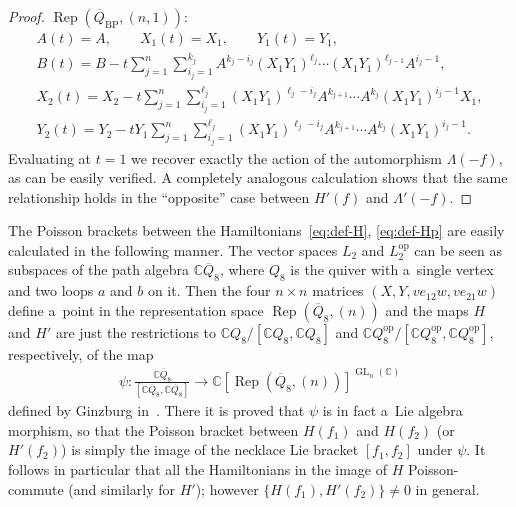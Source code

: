 \documentclass[11pt]{article}
\newcommand{\bb}[1]{\mathbb{#1}}
\newcommand{\app}[3]{#1\colon #2\to #3}
\newcommand{\ol}[1]{\overline{#1}}
\DeclareMathOperator{\GL}{GL}
\DeclareMathOperator{\Rep}{Rep}
\begin{document}
\begin{proof}
\(\Rep(\ol{Q}_{\mathrm{BP}},(n,1))\):
\begin{gather*}
A(t)=A,
\qquad
X_{1}(t)=X_{1},
\qquad
Y_{1}(t)=Y_{1},
\\
B(t)=B-t\sum_{j=1}^{n}\sum_{i_{j}=1}^{k_{j}}A^{k_{j}-i_{j}}(X_{1}Y_{1})^{\ell_{j}}\cdots(X_{1}Y_{1}
)^{\ell_{j-1}}A^{i_{j}-1},
\\
X_{2}(t)=X_{2}-t\sum_{j=1}^{n}\sum_{i_{j}=1}^{\ell_{j}}(X_{1}Y_{1})^{\ell_{j}-i_{j}}A^{k_{j+1}}
\cdots A^{k_{j}}(X_{1}Y_{1})^{i_{j}-1}X_{1},
\\
Y_{2}(t)=Y_{2}-t Y_{1}\sum_{j=1}^{n}\sum_{i_{j}=1}^{\ell_{j}}(X_{1}Y_{1})^{\ell_{j}-i_{j}}A^{k_{j+1}}
\cdots A^{k_{j}}(X_{1}Y_{1})^{i_{j}-1}.
\end{gather*}
Evaluating at \(t=1\) we recover exactly the action of the automorphism \(\Lambda(-f)\), as can be easily
verif\/ied.
A completely analogous calculation shows that the same relationship holds in the ``opposite'' case between
\(H'(f)\) and \(\Lambda'(-f)\).
\end{proof}

\begin{remark}
The Poisson brackets between the Hamiltonians~\eqref{eq:def-H}, \eqref{eq:def-Hp} are easily calculated in
the following manner.
The vector spaces \(L_{2}\) and \(L_{2}^{\mathrm{op}}\) can be seen as subspaces of the path algebra
\(\bb{C}\ol{Q}_{8}\), where \(Q_{8}\) is the quiver with a~single vertex and two loops \(a\) and \(b\) on
it.
Then the four \(n\times n\) matrices \((X, Y, ve_{12}w, ve_{21}w)\) def\/ine a~point in the representation
space \(\Rep(\ol{Q}_{8},(n))\) and the maps \(H\) and \(H'\) are just the restrictions to
\(\bb{C}Q_{8}/[\bb{C}Q_{8}, \bb{C}Q_{8}]\) and \(\bb{C}Q_{8}^{\mathrm{op}}/[\bb{C}Q_{8}^{\mathrm{op}},
\bb{C}Q_{8}^{\mathrm{op}}]\), respectively, of the map
\begin{gather*}
\app{\psi}{\frac{\bb{C}\ol{Q}_{8}}{[\bb{C}\ol{Q}_{8},\bb{C}\ol{Q}_{8}]}}{\bb{C}[\Rep(\ol{Q}_{8}
,(n))]^{\GL_{n}(\bb{C})}}
\end{gather*}
def\/ined by Ginzburg in~\cite{ginz01}.
There it is proved that \(\psi\) is in fact a~Lie algebra morphism, so that the Poisson bracket between
\(H(f_{1})\) and \(H(f_{2})\) (or \(H'(f_{2})\)) is simply the image of the necklace Lie bracket
\([f_{1},f_{2}]\) under \(\psi\).
It follows in particular that all the Hamiltonians in the image of \(H\) Poisson-commute (and similarly for
\(H'\)); however \(\{H(f_{1}),H'(f_{2})\}\neq 0\) in general.
\end{remark}
\end{document}
